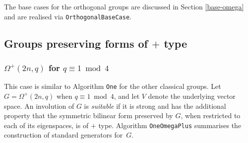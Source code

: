 \documentclass[12pt]{article}
\begin{document}
The base cases for the orthogonal groups are discussed
in Section \ref{base-omega} and are realised
via {\tt OrthogonalBaseCase}.

\subsection{Groups preserving forms of $+$ type}
\subsubsection{$\Omega^+(2n,q)$ for $q \equiv 1 \bmod 4$} \label{omega+}
This case is similar to 
Algorithm {\tt One} for the other classical groups. 
Let $G = \Omega^+(2n,q)$ when $q \equiv 1 \bmod 4$,
and let $V$ denote the underlying vector space.
An involution of $G$ is {\it suitable} 
if it is strong and has the additional property that 
the symmetric bilinear form preserved by $G$, when 
restricted to each of its eigenspaces, is of $+$ type.  
Algorithm {\tt OneOmegaPlus} summarises the construction
of standard generators for~$G$. 
\end{document}
